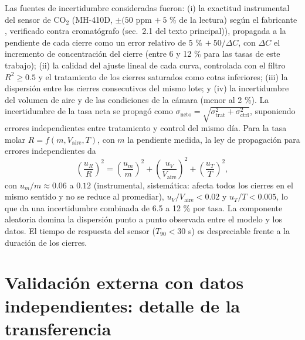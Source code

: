 \documentclass[11pt,a4paper]{article}
\begin{document}
Las fuentes de incertidumbre consideradas fueron: (i) la exactitud instrumental del sensor de CO$_2$ (MH-410D, $\pm(50$ ppm $+\ 5$ \% de la lectura) según el fabricante \parencite{winsenMH410D2022}, verificado contra cromatógrafo (sec.~2.1 del texto principal)), propagada a la pendiente de cada cierre como un error relativo de $5$ \% $+\ 50/\Delta C$, con $\Delta C$ el incremento de concentración del cierre (entre 6 y 12 \% para las tasas de este trabajo); (ii) la calidad del ajuste lineal de cada curva, controlada con el filtro $R^2 \geq 0.5$ y el tratamiento de los cierres saturados como cotas inferiores; (iii) la dispersión entre los cierres consecutivos del mismo lote; y (iv) la incertidumbre del volumen de aire y de las condiciones de la cámara (menor al 2 \%). La incertidumbre de la tasa neta se propagó como $\sigma_{\mathrm{neto}} = \sqrt{\sigma_{\mathrm{trat}}^2 + \sigma_{\mathrm{ctrl}}^2}$, suponiendo errores independientes entre tratamiento y control del mismo día. Para la tasa molar $R = f(m, V_{\mathrm{aire}}, T)$, con $m$ la pendiente medida, la ley de propagación para errores independientes da
\begin{equation}
\left(\frac{u_R}{R}\right)^2 = \left(\frac{u_m}{m}\right)^2 + \left(\frac{u_V}{V_{\mathrm{aire}}}\right)^2 + \left(\frac{u_T}{T}\right)^2,
\label{eq:propagacion}
\end{equation}
con $u_m/m \approx 0.06$ a $0.12$ (instrumental, sistemática: afecta todos los cierres en el mismo sentido y no se reduce al promediar), $u_V/V_{\mathrm{aire}} < 0.02$ y $u_T/T < 0.005$, lo que da una incertidumbre combinada de 6.5 a 12 \% por tasa. La componente aleatoria domina la dispersión punto a punto observada entre el modelo y los datos. El tiempo de respuesta del sensor ($T_{90} < 30$ s) es despreciable frente a la duración de los cierres.

\section{Validación externa con datos independientes: detalle de la transferencia}
\label{sec:validaciones_si}
\end{document}
